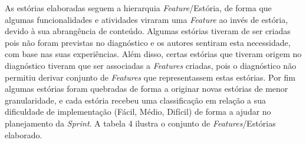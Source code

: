 As estórias elaboradas seguem a hierarquia \textit{Feature}/Estória, de forma que algumas funcionalidades e atividades viraram uma \textit{Feature} ao invés de estória, devido à sua abrangência de conteúdo. Algumas estórias tiveram de ser criadas pois não foram previstas no diagnóstico e os autores sentiram esta necessidade, com base nas suas experiências. Além disso, certas estórias que tiveram origem no diagnóstico tiveram que ser associadas a \textit{Features} criadas, pois o diagnóstico não permitiu derivar conjunto de \textit{Features} que representassem estas estórias. Por fim algumas estórias foram quebradas de forma a originar novas estórias de menor granularidade, e cada estória recebeu uma classificação em relação a sua dificuldade de implementação (Fácil, Médio, Difícil) de forma a ajudar no planejamento da \textit{Sprint}. A tabela 4 ilustra o conjunto de \textit{Features}/Estórias elaborado.

